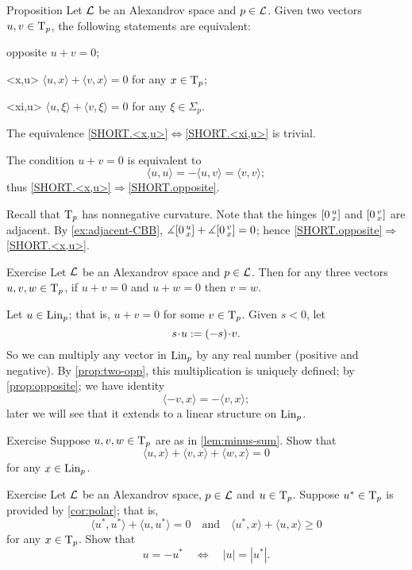 \begin{thm}{Proposition}\label{prop:opposite}
Let $\mathcal{L}$ be an Alexandrov space and $p\in \mathcal{L}$.
Given two vectors $u,v\in\mathrm{T}_p$, the following statements are equivalent:
\begin{subthm}{opposite} $u+v=0$;
\end{subthm}
\begin{subthm}{<x,u>} $\langle u,x\rangle +\langle v,x\rangle =0$ for any $x\in\mathrm{T}_p$;
\end{subthm}
\begin{subthm}{<xi,u>} $\langle u,\xi\rangle +\langle v,\xi\rangle =0$ for any $\xi\in\Sigma_p$.
\end{subthm}
\end{thm}

The equivalence  \ref{SHORT.<x,u>}$\Leftrightarrow$\ref{SHORT.<xi,u>} is trivial.

The condition $u+v=0$ is equivalent to 
\[\langle u,u\rangle =-\langle u,v\rangle =\langle v,v\rangle ;\]
thus 
\ref{SHORT.<x,u>}$\Rightarrow$\ref{SHORT.opposite}.

Recall that $\mathrm{T}_p$ has nonnegative curvature.
Note that the hinges $[0\,{}^{u}_{x}]$ and $[0\,{}^{v}_{x}]$ are adjacent.
By \ref{ex:adjacent-CBB}, $\measuredangle[0\,{}^{u}_{x}]+\measuredangle[0\,{}^{v}_{x}]=0$;
hence \ref{SHORT.opposite}$\Rightarrow$\ref{SHORT.<x,u>}.
\qeds

\begin{thm}{Exercise}\label{prop:two-opp}
Let $\mathcal{L}$  be an Alexandrov space and $p\in \mathcal{L}$.
Then for any three vectors $u,v,w\in\mathrm{T}_p$, if $u+v=0$ and $u+ w=0$ then $v=w$.
\end{thm}

Let $u\in \mathop{\rm Lin}\nolimits_p$; that is, $u+v=0$ for some $v\in\mathrm{T}_p$.
Given $s<0$, let 
\[s\cdot u\df (-s)\cdot v.\]
So we can multiply any vector in $\mathop{\rm Lin}\nolimits_p$ by any real number (positive and negative).
By \ref{prop:two-opp}, this multiplication is uniquely defined;
by \ref{prop:opposite}; we have identity
\[\langle -v,x\rangle=-\langle v,x\rangle;\]
later we will see that it extends to a linear structure on $\mathop{\rm Lin}\nolimits_p$.

\begin{thm}{Exercise}\label{ex:3<,>=0}
Suppose $u,v,w\in\mathrm{T}_p$ are as in \ref{lem:minus-sum}.
Show that
\[\langle u,x\rangle +\langle v,x\rangle +\langle w,x\rangle = 0\]
for any $x\in \mathop{\rm Lin}\nolimits_p$.
\end{thm}

\begin{thm}{Exercise}\label{ex:-u}
Let $\mathcal{L}$ be an Alexandrov space,
$p\in \mathcal{L}$ and $u\in \mathrm{T}_p$.
Suppose $u^*\in \mathrm{T}_p$ is provided by \ref{cor:polar};
that is, 
\[\langle u^*,u^*\rangle +\langle u,u^*\rangle = 0
\quad\text{and}\quad
\langle u^*,x\rangle +\langle u,x\rangle \ge 0
\]
for any $x\in \mathrm{T}_p$.
Show that 
\[u=-u^*\quad\Longleftrightarrow\quad|u|=|u^*|.\]
\end{thm}



